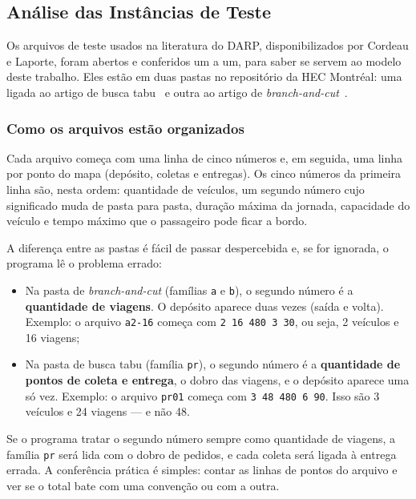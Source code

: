 \documentclass[12pt,a4paper]{article}
\theoremstyle{plain}
\begin{document}
\subsection{Análise das Instâncias de Teste}
\label{sec:instancias}

Os arquivos de teste usados na literatura do DARP, disponibilizados por Cordeau e Laporte, foram abertos e conferidos um a um, para saber se servem ao modelo deste trabalho. Eles estão em duas pastas no repositório da HEC Montréal: uma ligada ao artigo de busca tabu~\cite{cordeau2003} e outra ao artigo de \textit{branch-and-cut}~\cite{cordeau2006}.

\subsubsection{Como os arquivos estão organizados}

Cada arquivo começa com uma linha de cinco números e, em seguida, uma linha por ponto do mapa (depósito, coletas e entregas). Os cinco números da primeira linha são, nesta ordem: quantidade de veículos, um segundo número cujo significado muda de pasta para pasta, duração máxima da jornada, capacidade do veículo e tempo máximo que o passageiro pode ficar a bordo.

A diferença entre as pastas é fácil de passar despercebida e, se for ignorada, o programa lê o problema errado:

\begin{itemize}
    \item Na pasta de \textit{branch-and-cut} (famílias \texttt{a} e \texttt{b}), o segundo número é a \textbf{quantidade de viagens}. O depósito aparece duas vezes (saída e volta). Exemplo: o arquivo \texttt{a2-16} começa com \texttt{2 16 480 3 30}, ou seja, 2 veículos e 16 viagens;
    \item Na pasta de busca tabu (família \texttt{pr}), o segundo número é a \textbf{quantidade de pontos de coleta e entrega}, o dobro das viagens, e o depósito aparece uma só vez. Exemplo: o arquivo \texttt{pr01} começa com \texttt{3 48 480 6 90}. Isso são 3 veículos e 24 viagens --- e não 48.
\end{itemize}

Se o programa tratar o segundo número sempre como quantidade de viagens, a família \texttt{pr} será lida com o dobro de pedidos, e cada coleta será ligada à entrega errada. A conferência prática é simples: contar as linhas de pontos do arquivo e ver se o total bate com uma convenção ou com a outra.
\end{document}
